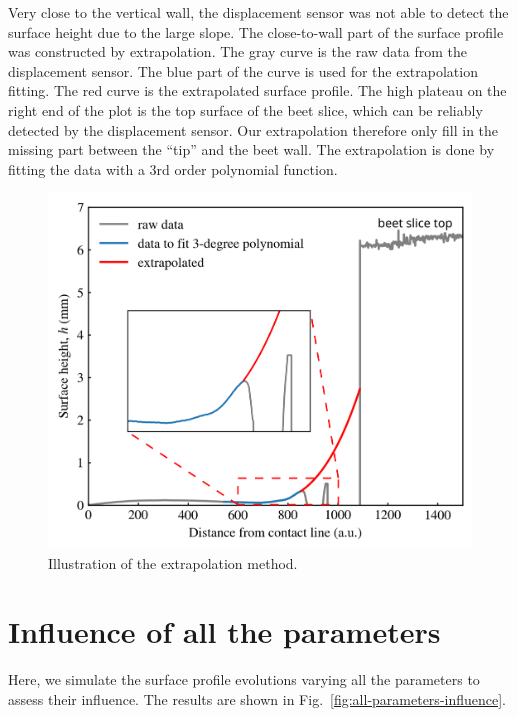 \documentclass[aps,preprint]{revtex4-2}
\begin{document}
Very close to the vertical wall, the displacement sensor was not able to detect the surface height due to the large slope.
The close-to-wall part of the surface profile was constructed by extrapolation.
The gray curve is the raw data from the displacement sensor. 
The blue part of the curve is used for the extrapolation fitting. The red curve is the extrapolated surface profile. 
The high plateau on the right end of the plot is the top surface of the beet slice, which can be reliably detected by the displacement sensor. 
Our extrapolation therefore only fill in the missing part between the ``tip'' and the beet wall. 
The extrapolation is done by fitting the data with a 3rd order polynomial function.

\begin{figure}[ht]
    \centering
    \includegraphics[width=\textwidth]{Figures/extrapolation_illustration.png}
    \caption{
    Illustration of the extrapolation method. 
    }
    \label{fig:extrapolation}
\end{figure}

\newpage

\section{Influence of all the parameters}

Here, we simulate the surface profile evolutions varying all the parameters to assess their influence. The results are shown in Fig.~\ref{fig:all-parameters-influence}.
\end{document}
